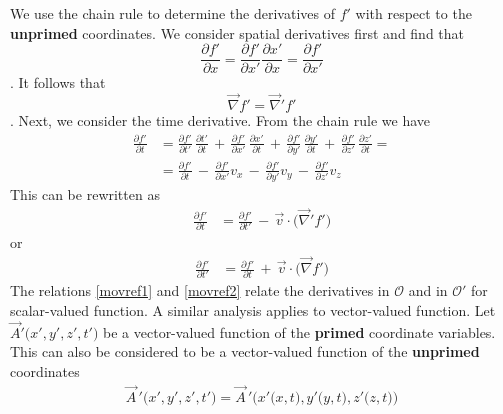 \documentclass[12pt,a4paper,oneside]{book}
\begin{document}
\begin{onehalfspace}
We use the chain rule to determine the derivatives of $f'$ with respect to the \textbf{unprimed} coordinates. We consider spatial derivatives first and find that $$ \frac{\partial f'}{\partial x} =  \frac{\partial f'}{\partial x'} \frac{\partial x'}{\partial x} = \frac{\partial f'}{\partial x'}$$.
It follows that $$ \vec{\nabla}f'=\vec{\nabla}'f'$$.
Next, we consider the time derivative. From the chain rule we have 
  \begin{equation}
	\begin{aligned}
		\frac{\partial f'}{\partial t} &= \frac{\partial f'}{\partial t'}\,\frac{\partial t'}{\partial t}\,+\,\frac{\partial f'}{\partial x'}\,\frac{\partial x'}{\partial t}\,+\,\frac{\partial f'}{\partial y'}\,\frac{\partial y'}{\partial t}\,+\,\frac{\partial f'}{\partial z'}\,\frac{\partial z'}{\partial t} = \\[8pt]
		& = \frac{\partial f'}{\partial t}\,-\,\frac{\partial f'}{\partial x'} v_x\,-\,\frac{\partial f'}{\partial y'} v_y\,-\,\frac{\partial f'}{\partial z'} v_z
	\end{aligned}
\end{equation} 
This can be rewritten as 
  \begin{equation}\label{movref1}
	\begin{aligned}
		\frac{\partial f'}{\partial t} &= \frac{\partial f'}{\partial t'}\,-\,\vec{v}\cdot\big(\vec{\nabla}'f'\big)
	\end{aligned}
\end{equation} 
or
  \begin{equation}\label{movref2}
	\begin{aligned}
		\frac{\partial f'}{\partial t'} &= \frac{\partial f'}{\partial t}\,+\,\vec{v}\cdot\big(\vec{\nabla}f'\big)
	\end{aligned}
\end{equation} 
The relations \ref{movref1} and \ref{movref2} relate the derivatives in $\mathcal{O}$ and in $\mathcal{O'}$ for scalar-valued function. A similar analysis applies to vector-valued function. Let $\vec{A}'\big(x',y',z',t'\big)$ be a vector-valued function of the \textbf{primed} coordinate variables. This can also be considered to be a vector-valued function of the \textbf{unprimed} coordinates
\begin{equation*}
	\begin{aligned}
		\vec{A}\,'\big(x',y',z',t'\big) = 	\vec{A}\,'\big(x'\big(x,t\big),y'\big(y,t\big),z'\big(z,t\big)\big)
	\end{aligned}
\end{equation*} 

\end{onehalfspace}
\end{document}
